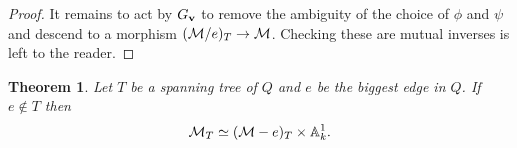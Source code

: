 \documentclass{amsart}
\newtheorem{thm}{Theorem}[section]
\theoremstyle{definition}
\begin{document}
\begin{proof}
It remains to act by $G_{\mathbf{v}}$ to remove the ambiguity of the choice of $\phi$ and $\psi$ and descend to a morphism $(\mathcal{M}/e)_T \rightarrow \mathcal{M}$.
Checking these are mutual inverses is left to the reader.
\end{proof}

\begin{thm}\label{thm:delete}
Let $T$ be a spanning tree of $Q$ and $e$ be the biggest edge in $Q$.
If $e \notin T$ then $$\mathcal{M}_T \simeq (\mathcal{M}-e)_T \times \mathbb{A}_k^1.$$
\end{thm}
\end{document}
